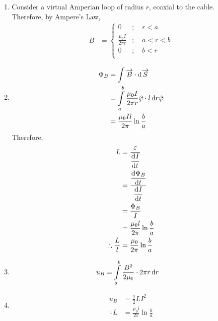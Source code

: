 \documentclass[fleqn, a4paper, 12pt, twoside]{article}
\theoremstyle{definition}
\theoremstyle{theorem}
\begin{document}
\begin{solution}
	\begin{enumerate}[leftmargin = *]
		\item
			Consider a virtual Amperian loop of radius $r$, coaxial to the cable.\\
			Therefore, by Ampere's Law,
			\begin{align*}
				B &=
					\begin{cases}
						0                       & ;\quad r < a     \\
						\frac{\mu_0 I}{2 \pi r} & ;\quad a < r < b \\
						0                       & ;\quad b < r     \\
					\end{cases}
			\end{align*}
		\item
			\begin{align*}
				\Phi_B & = \int \overrightarrow{B} \cdot \dif \overrightarrow{S}                                  \\
                                       & = \int\limits_{a}^{b} \frac{\mu_0 I}{2 \pi r} \hat{\varphi} \cdot l \dif r \hat{\varphi} \\
                                       & = \frac{\mu_0 I l}{2 \pi} \ln \frac{b}{a}
			\end{align*}
			Therefore,
			\begin{align*}
				L                      & = \frac{\varepsilon}{\dod{I}{t}}        \\
                                                       & = \frac{\dod{\Phi_B}{t}}{\dod{I}{t}}    \\
                                                       & = \frac{\Phi_B}{I}                      \\
                                                       & = \frac{\mu_0 l}{2 \pi} \ln \frac{b}{a} \\
				\therefore \frac{L}{l} & = \frac{\mu_0}{2 \pi} \ln \frac{b}{a}
			\end{align*}
		\item
			\begin{align*}
				u_B &= \int\limits_{a}^{b} \frac{B^2}{2 \mu_0} \cdot 2 \pi r \dif r
			\end{align*}
		\item
			\begin{align*}
				u_B &= \frac{1}{2} L I^2\\
				\therefore L &= \frac{\mu_0 l}{2 \pi} \ln \frac{b}{a}
			\end{align*}
	\end{enumerate}
\end{solution}
\end{document}
